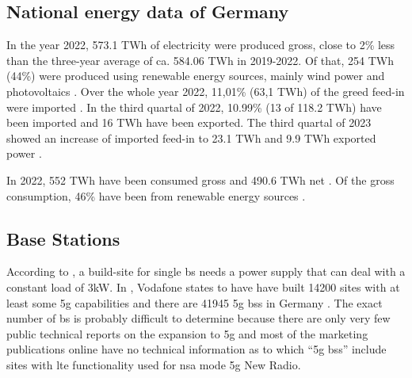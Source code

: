 \documentclass[11pt,a4paper]{article}
\begin{document}
\subsection{National energy data of Germany}\label{subsec:nationalaverage}
In the year 2022, 573.1 TWh of electricity were produced gross, close to 2\% less than the three-year average of ca. 584.06 TWh in 2019-2022.
Of that, 254 TWh (44\%) were produced using renewable energy sources, mainly wind power and photovoltaics \citep{Bruttostromerzeugung}.
Over the whole year 2022, 11,01\% (63,1 TWh) of the greed feed-in were imported \citep{energieErzeugung}.
In the third quartal of 2022, 10.99\% (13 of 118.2 TWh) have been imported and 16 TWh have been exported.
The third quartal of 2023 showed an increase of imported feed-in to 23.1 TWh and 9.9 TWh exported power \citep{stromerzeugung3Quartal2023}.

In 2022, 552 TWh have been consumed gross \citep{Stromverbrauch} and 490.6 TWh net \citep{NettoStromverbrauch}.
Of the gross consumption, 46\% have been from renewable energy sources \citep{Stromverbrauch}.

\subsection{Base Stations}\label{subsec:BSInfluence}

According to \cite{BSStandort}, a build-site for single \acrshort{bs} needs a power supply that can deal with a constant load of 3kW.
In \cite{vodafoneAusbau}, Vodafone states to have have built 14200 sites with at least some \acrshort{5g} capabilities and there are 41945 \acrshort{5g} \acrlong{bs}s in Germany \citep{5gBS}.
The exact number of \acrshort*{bs} is probably difficult to determine because there are only very few public technical reports on the expansion to \acrshort{5g} and most of the marketing publications online have no technical information as to which \enquote{\acrshort{5g} \acrlong{bs}s} include sites with \acrfull{lte} functionality used for \acrfull{nsa} mode \acrshort{5g} New Radio.
\end{document}
